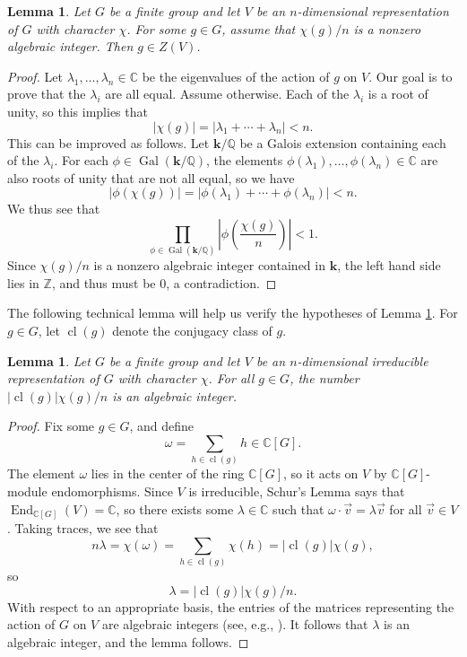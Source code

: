 \documentclass[11pt]{article}
\numberwithin{equation}{section}
\theoremstyle{plain}
\newtheorem{lemma}[theorem]{Lemma}
\theoremstyle{definition}
\DeclareMathOperator{\End}{End}
\newcommand\C{\ensuremath{\mathbb{C}}}
\newcommand\Z{\ensuremath{\mathbb{Z}}}
\newcommand\Q{\ensuremath{\mathbb{Q}}}
\DeclareMathOperator{\Gal}{Gal}
\DeclareMathOperator{\cl}{cl}
\newcommand\bk{\ensuremath{\mathbf{k}}}
\begin{document}
\begin{lemma}
\label{lemma:detectcentral}
Let $G$ be a finite group and let $V$ be an $n$-dimensional representation of $G$ with character $\chi$.  For
some $g \in G$, assume that $\chi(g)/n$ is a nonzero algebraic integer.  Then $g \in Z(V)$.
\end{lemma}
\begin{proof}
Let $\lambda_1,\ldots,\lambda_n \in \C$ be the eigenvalues of the action of $g$ on $V$.  Our goal is to
prove that the $\lambda_i$ are all equal.  Assume otherwise.  Each of the $\lambda_i$ is a root of unity,
so this implies that
\[|\chi(g)| = |\lambda_1+\cdots+\lambda_n| < n.\]
This can be improved as follows.  Let $\bk/\Q$ be a Galois extension containing each of the $\lambda_i$.  For
each $\phi \in \Gal(\bk/\Q)$, the elements $\phi(\lambda_1),\ldots,\phi(\lambda_n) \in \C$ are also roots
of unity that are not all equal, so we have
\[|\phi(\chi(g))| = |\phi(\lambda_1)+\cdots+\phi(\lambda_n)| < n.\]
We thus see that
\[\prod_{\phi \in \Gal(\bk/\Q)} |\phi\left(\frac{\chi(g)}{n}\right)| < 1.\]
Since $\chi(g)/n$ is a nonzero algebraic integer contained in $\bk$, the left hand side lies in $\Z$, and
thus must be $0$, a contradiction.
\end{proof}

The following technical lemma will help us verify the hypotheses of Lemma \ref{lemma:detectcentral}.  For
$g \in G$, let $\cl(g)$ denote the conjugacy class of $g$.

\begin{lemma}
\label{lemma:conjugacymult}
Let $G$ be a finite group and let $V$ be an $n$-dimensional irreducible representation of $G$ with
character $\chi$.  For all $g \in G$, the number $|\cl(g)| \chi(g)/n$ is an algebraic integer.
\end{lemma}
\begin{proof}
Fix some $g \in G$, and define
\[\omega = \sum_{h \in \cl(g)} h \in \C[G].\]
The element $\omega$ lies in the center of the ring $\C[G]$, so it acts on $V$ by $\C[G]$-module endomorphisms.
Since $V$ is irreducible, Schur's Lemma says that $\End_{\C[G]}(V) = \C$, so there exists some
$\lambda \in \C$ such that $\omega \cdot \vec{v} = \lambda \vec{v}$ for all $\vec{v} \in V$.  Taking traces,
we see that
\[n \lambda = \chi(\omega) = \sum_{h \in \cl(g)} \chi(h) = |\cl(g)| \chi(g),\]
so
\[\lambda = |\cl(g)| \chi(g)/n.\]
With respect to an appropriate basis, the entries of the matrices representing the action of $G$ on $V$ are
algebraic integers (see, e.g., \cite{PutmanAlg}).  It follows that $\lambda$ is an algebraic integer, and the lemma follows.
\end{proof}
\end{document}
